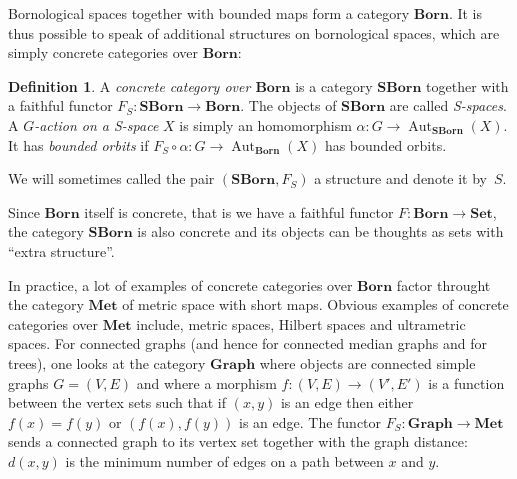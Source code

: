 \documentclass[a4paper]{article}
\theoremstyle{definition}
\newtheorem{defn}[lem]{Definition}
\DeclareMathOperator\Hom{Hom}
\DeclareMathOperator\Aut{Aut}
\begin{document}
Bornological spaces together with bounded maps form a category $\mathbf{Born}$.
It is thus possible to speak of additional structures on bornological spaces, which are simply concrete categories over $\mathbf{Born}$:
%
%
%
\begin{defn}\label{Def:Categoric}
A \emph{concrete category over $\mathbf{Born}$} is a category $\mathbf{SBorn}$ together with a faithful functor $F_{S}\colon \mathbf{SBorn}\to \mathbf{Born}$.
The objects of $\mathbf{SBorn}$ are called \emph{S-spaces}.
A \emph{$G$-action on a S-space} $X$ is simply an homomorphism $\alpha\colon G\to\Aut_{\mathbf{SBorn}}(X)$. It has \emph{bounded orbits} if $F_S\circ \alpha\colon G\to \Aut_{\mathbf{Born}}(X)$ has bounded orbits.
\end{defn}
%
%
We will sometimes called the pair $(\mathbf{SBorn},F_S)$ a structure and denote it by~$S$.

Since $\mathbf{Born}$ itself is concrete, that is we have a faithful functor $F\colon \mathbf{Born}\to\mathbf{Set}$, the category $\mathbf{SBorn}$ is also concrete and its objects can be thoughts as sets with ``extra structure''.

In practice, a lot of examples of concrete categories over $\mathbf{Born}$ factor throught the category $\mathbf{Met}$ of metric space with short maps.
Obvious examples of concrete categories over $\mathbf{Met}$ include, metric spaces, Hilbert spaces and ultrametric spaces.
For connected graphs (and hence for connected median graphs and for trees), one looks at the category $\mathbf{Graph}$ where objects are connected simple graphs $G=(V,E)$ and where a morphism $f\colon (V,E)\to(V',E')$ is a function between the vertex sets such that if $(x,y)$ is an edge then either $f(x)=f(y)$ or $(f(x),f(y))$ is an edge.
The functor $F_S\colon\mathbf{Graph}\to\mathbf{Met}$ sends a connected graph to its vertex set together with the graph distance: $d(x,y)$ is the minimum number of edges on a path between $x$ and $y$.
\end{document}
